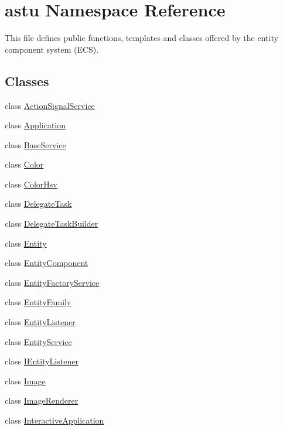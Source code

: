 \hypertarget{namespaceastu}{}\section{astu Namespace Reference}
\label{namespaceastu}


This file defines public functions, templates and classes offered by the entity component system (E\+CS).  


\subsection*{Classes}
\begin{DoxyCompactItemize}
\item 
class \hyperlink{classastu_1_1ActionSignalService}{Action\+Signal\+Service}
\item 
class \hyperlink{classastu_1_1Application}{Application}
\item 
class \hyperlink{classastu_1_1BaseService}{Base\+Service}
\item 
class \hyperlink{classastu_1_1Color}{Color}
\item 
class \hyperlink{classastu_1_1ColorHsv}{Color\+Hsv}
\item 
class \hyperlink{classastu_1_1DelegateTask}{Delegate\+Task}
\item 
class \hyperlink{classastu_1_1DelegateTaskBuilder}{Delegate\+Task\+Builder}
\item 
class \hyperlink{classastu_1_1Entity}{Entity}
\item 
class \hyperlink{classastu_1_1EntityComponent}{Entity\+Component}
\item 
class \hyperlink{classastu_1_1EntityFactoryService}{Entity\+Factory\+Service}
\item 
class \hyperlink{classastu_1_1EntityFamily}{Entity\+Family}
\item 
class \hyperlink{classastu_1_1EntityListener}{Entity\+Listener}
\item 
class \hyperlink{classastu_1_1EntityService}{Entity\+Service}
\item 
class \hyperlink{classastu_1_1IEntityListener}{I\+Entity\+Listener}
\item 
class \hyperlink{classastu_1_1Image}{Image}
\item 
class \hyperlink{classastu_1_1ImageRenderer}{Image\+Renderer}
\item 
class \hyperlink{classastu_1_1InteractiveApplication}{Interactive\+Application}
\item 

\end{DoxyCompactItemize}
